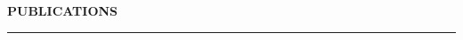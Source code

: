 \documentclass[a4paper]{article}
\newcommand{\myline}{\par
  \kern2pt %
  \hrule height 0.5pt
  \kern2pt %
}
\newcommand{\mybullet}{
	\indent 
  \textbullet \hspace*{2mm}
}
\begin{document}
	


  \newpage
	\noindent
	{\large \textbf{PUBLICATIONS}}
	\myline 
	\smallskip
\end{document}
